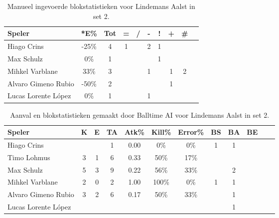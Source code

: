 \begin{table}[ht!]
  \centering
  \scriptsize
    \begin{tabular}{|l|c|c|c|c|c|c|c|c|c|}
      \hline
      \textbf{Speler} & *E\% & Tot & = & / & - & ! & + & \# \\ \hline
      Hiago Crins & -25\% & 4 & 1 &  & 2 & 1 &  &  \\ 
      Max Schulz & 0\% & 1 &  &  &  & 1 &  & \\
      Mihkel Varblane & 33\% & 3 &  &  & 1 &  & 1 & 2 \\
      Alvaro Gimeno Rubio & -50\% & 2 &  & &  &  & 1 &  \\
      Lucas Lorente López & 0\% & 1 &  &  & 1 &  &  &  \\ \hline
  \end{tabular}
\caption[Manueel ingevoerde blokstatistieken voor Lindemans Aalst in set 2]{\label{tab:PL1BlockAalstMan2}Manueel ingevoerde blokstatistieken voor Lindemans Aalst in set 2.}
\end{table}

\begin{table}[ht!]
  \centering
  \scriptsize
  \begin{tabular}{|l|c|c|c|c|c|c|c|c|c|c|c|} \hline
    \textbf{Speler} & K & E & TA & Atk\% & Kill\%  & Error\% & BS & BA & BE \\ \hline
    Hiago Crins & & & 1 & 0.00 & 0\%  & 0\% & 1 & 1 &\\
    Timo Lohmus & 3 & 1 & 6 & 0.33 & 50\%  & 17\% &  &  & \\
    Max Schulz & 5 & 3 & 9 & 0.22 & 56\%  & 33\% &  & 2 &  \\
    Mihkel Varblane & 2 & 0 & 2 & 1.00 & 100\%  & 0\% & 1 & 1 &  \\
    Alvaro Gimeno Rubio & 3 & 2 & 6 & 0.17 & 50\%  & 33\% &  & 1 & \\
    Lucas Lorente López &  &  &  &  &  &  &  & 1 & \\ \hline
  \end{tabular}
  \caption[Aanvals- en blokstatistieken gemaakt door Balltime AI voor Lindemans Aalst in set 2]{\label{tab:PL1AttBlockAalstAI2}Aanval en blokstatistieken gemaakt door Balltime AI voor Lindemans Aalst in set 2.}
\end{table}

